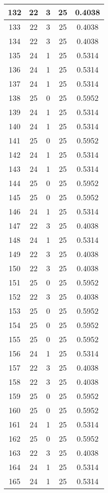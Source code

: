 \documentclass[letterpaper, 12pt]{article}
\begin{document}
\begin{longtable}{|c|c|c|c|c|}
\hline
132 & 22 & 3 & 25 & 0.4038 \\
\hline
133 & 22 & 3 & 25 & 0.4038 \\
\hline
134 & 22 & 3 & 25 & 0.4038 \\
\hline
135 & 24 & 1 & 25 & 0.5314 \\
\hline
136 & 24 & 1 & 25 & 0.5314 \\
\hline
137 & 24 & 1 & 25 & 0.5314 \\
\hline
138 & 25 & 0 & 25 & 0.5952 \\
\hline
139 & 24 & 1 & 25 & 0.5314 \\
\hline
140 & 24 & 1 & 25 & 0.5314 \\
\hline
141 & 25 & 0 & 25 & 0.5952 \\
\hline
142 & 24 & 1 & 25 & 0.5314 \\
\hline
143 & 24 & 1 & 25 & 0.5314 \\
\hline
144 & 25 & 0 & 25 & 0.5952 \\
\hline
145 & 25 & 0 & 25 & 0.5952 \\
\hline
146 & 24 & 1 & 25 & 0.5314 \\
\hline
147 & 22 & 3 & 25 & 0.4038 \\
\hline
148 & 24 & 1 & 25 & 0.5314 \\
\hline
149 & 22 & 3 & 25 & 0.4038 \\
\hline
150 & 22 & 3 & 25 & 0.4038 \\
\hline
151 & 25 & 0 & 25 & 0.5952 \\
\hline
152 & 22 & 3 & 25 & 0.4038 \\
\hline
153 & 25 & 0 & 25 & 0.5952 \\
\hline
154 & 25 & 0 & 25 & 0.5952 \\
\hline
155 & 25 & 0 & 25 & 0.5952 \\
\hline
156 & 24 & 1 & 25 & 0.5314 \\
\hline
157 & 22 & 3 & 25 & 0.4038 \\
\hline
158 & 22 & 3 & 25 & 0.4038 \\
\hline
159 & 25 & 0 & 25 & 0.5952 \\
\hline
160 & 25 & 0 & 25 & 0.5952 \\
\hline
161 & 24 & 1 & 25 & 0.5314 \\
\hline
162 & 25 & 0 & 25 & 0.5952 \\
\hline
163 & 22 & 3 & 25 & 0.4038 \\
\hline
164 & 24 & 1 & 25 & 0.5314 \\
\hline
165 & 24 & 1 & 25 & 0.5314 \\

\end{longtable}
\end{document}
